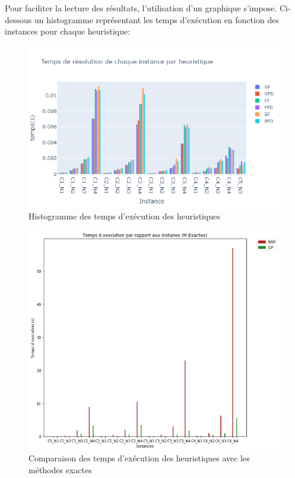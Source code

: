 \documentclass[class=article, crop=false]{standalone}
\begin{document}
Pour faciliter la lecture des résultats, l’utilisation d’un graphique s’impose. Ci-dessous un histogramme représentant les temps d’exécution en fonction des instances pour chaque heuristique:
\begin{figure}[H] 
    \includegraphics[width=\linewidth]{../figures/Temps_exec_heuristics.png}
    \caption{Histogramme des temps d'exécution des heuristiques}
\end{figure}

\begin{figure}[H] 
    \includegraphics[width=\linewidth]{../figures/Graphe_M_Exactes.png}
    \caption{Comparaison des temps d'exécution des heuristiques avec les méthodes exactes}
\end{figure}
\end{document}

